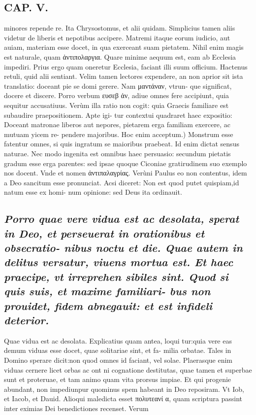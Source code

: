 \documentclass{article}
\begin{document}
\begin{pages}
\section*{CAP. V. }
\marginpar{[ p.57 ]}\pstart minores repende re. Ita Chrysostomus, et alii quidam. Simplicius tamen aliis videtur de liberis et nepotibus accipere. Matremi itaque eorum iudicio, aut auiam, materiam esse docet, in qua exerceant suam pietatem. Nihil enim magis est naturale, quam ἀντιπολαργια. Quare minime aequum est, eam ab Ecclesia impediri. Prius ergo quam oneretur Ecclesia, faciant illi suum officium. Hactenus retuli, quid alii sentiant. Velim tamen lectores expendere, an non aprior sit ista translatio: doceant pie se domi gerere. Nam μαντάναν, vtrun- que significat, docere et discere. Porro verbum ευσεβ ἀν, adiue omnes fere accipiunt, quia sequitur accusatiuus. Verùm illa ratio non cogit: quia Graecis familiare est subaudire praepositionem. Apte igi- tur contextui quadraret haec expositio: Doceant matronae liberos aut nepores, pietarem erga familiam exercere, ac mutuam yicem re- pendere majoribus.  \pend\pstart Hoc enim acceptum.) Monstrum esse fatentur omnes, si quis ingratum se maioribus praebeat. Id enim dictat sensus naturae. Nec modo ingenita est omnibus haec persuasio: secundum pietatis gradum esse erga parentes: sed ipsae quoque Ciconiae gratirudinem suo exemplo nos docent. Vnde et nomen ἀντιπαλαγρίας. Verùni Paulus eo non contentus, idem a Deo sancitum esse pronunciat. Acsi diceret: Non est quod putet quispiam,id natum esse ex homi- num opinione: sed Deus ita ordinauit.  \pend
{}
{}
\subsection*{\textit{Porro quae vere vidua est ac desolata, sperat in Deo, et perseuerat in orationibus et obsecratio- nibus noctu et die. Quae autem in delitus versatur, viuens mortua est. Et haec praecipe, vt irreprehen sibiles sint. Quod si quis suis, et maxime familiari- bus non prouidet, fidem abnegauit: et est infideli deterior. }}\pstart Quae vidua est ac desolata. Explicatius quam antea, loqui tur:quia vere eas demum viduas esse docet, quae solitariae sint, et fa- milia orbatae. Tales in Domino sperare dicit:non quod omnes id faciant, vel solae. Plaerasque enim viduas cernere licet orbas ac ont ni cognatione destitutas, quae tamen et superbae sunt et proteruae, et tam animo quam vita prorsus impiae. Et qui progenie abundant, non impediunpur quominus spem habeant in Deo reposiram. Vt Iob, et Iacob, et Dauid. Alioqui maledicta esset πολυτεανί α, quam scriptura passint inter eximias Dei benedictiones recenset. Verum  \pend

\end{pages}
\end{document}
